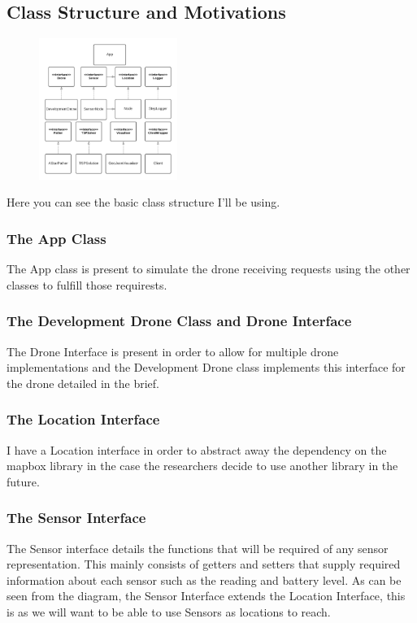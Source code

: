 \documentclass[12pt]{article}
\begin{document}
\subsection{Class Structure and Motivations}
\begin{figure}
\includegraphics[width=0.4\textwidth]{ILP Basic Class Diagram.png}
\end{figure}
Here you can see the basic class structure I'll be using. 
\subsubsection{The App Class}
The App class is present to simulate the drone receiving requests using the other classes to fulfill those requirests.
\subsubsection{The Development Drone Class and Drone Interface}
The Drone Interface is present in order to allow for multiple drone implementations and the Development Drone class implements this interface for the drone detailed in the brief.
\subsubsection{The Location Interface}I have a Location interface in order to abstract away the dependency on the mapbox library in the case the researchers decide to use another library in the future.
\subsubsection{The Sensor Interface}
The Sensor interface details the functions that will be required of any sensor representation. This mainly consists of getters and setters that supply required information about each sensor such as the reading and battery level. As can be seen from the diagram, the Sensor Interface extends the Location Interface, this is as we will want to be able to use Sensors as locations to reach.
\end{document}
